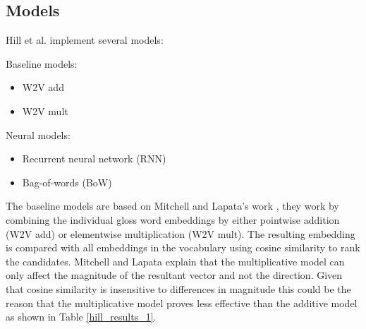 \documentclass[11pt]{article}
\begin{document}
\begin{spacing}{1}
\subsection{Models}
Hill et al. \citeyear{hill2015learning} implement several models:

Baseline models:
\begin{itemize}
\item W2V add
\item W2V mult
\end{itemize}

Neural models:
\begin{itemize}
\item Recurrent neural network (RNN)
\item Bag-of-words (BoW)
\end{itemize}
The baseline models are based on Mitchell and Lapata's work \citeyear{mitchell2010composition}, they work by combining the individual gloss word embeddings by either pointwise addition (W2V add) or elementwise multiplication (W2V mult). The resulting embedding is compared with all embeddings in the vocabulary using cosine similarity to rank the candidates. Mitchell and Lapata \citeyear{mitchell2010composition} explain that the multiplicative model can only affect the magnitude of the resultant vector and not the direction. Given that cosine similarity is insensitive to differences in magnitude this could be the reason that the multiplicative model proves less effective than the additive model as shown in Table \ref{hill_results_1}.


\end{spacing}
\end{document}
